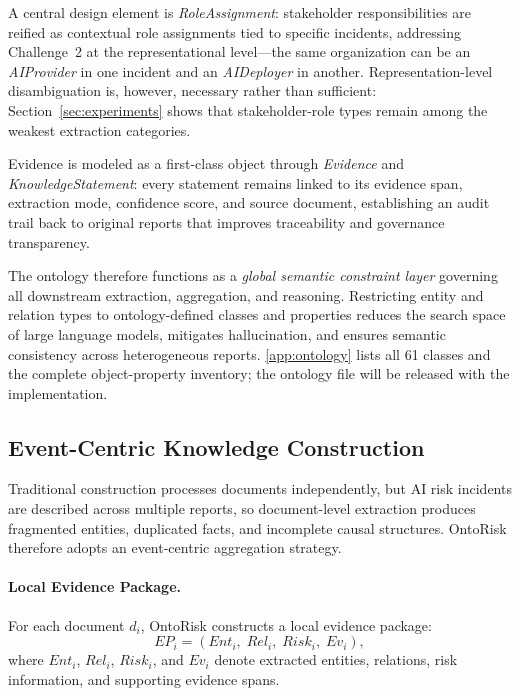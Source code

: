 \documentclass[a4paper,fleqn]{cas-dc}
\begin{document}
A central design element is \textit{RoleAssignment}: stakeholder
responsibilities are reified as contextual role assignments tied to
specific incidents, addressing Challenge~2 at the representational
level---the same organization can be an \textit{AIProvider} in one
incident and an \textit{AIDeployer} in another.
Representation-level disambiguation is, however, necessary rather
than sufficient: Section~\ref{sec:experiments} shows that
stakeholder-role types remain among the weakest extraction
categories.

Evidence is modeled as a first-class object through
\textit{Evidence} and \textit{KnowledgeStatement}: every statement
remains linked to its evidence span, extraction mode, confidence
score, and source document, establishing an audit trail back to
original reports that improves traceability and governance
transparency.

The ontology therefore functions as a \emph{global semantic
constraint layer} governing all downstream extraction, aggregation,
and reasoning.
Restricting entity and relation types to ontology-defined classes and
properties reduces the search space of large language models,
mitigates hallucination, and ensures semantic consistency across
heterogeneous reports.
\ref{app:ontology} lists all 61 classes and the complete
object-property inventory; the ontology file will be released
with the implementation.

\subsection{Event-Centric Knowledge Construction}

Traditional construction processes documents independently, but AI
risk incidents are described across multiple reports, so
document-level extraction produces fragmented entities, duplicated
facts, and incomplete causal structures.
OntoRisk therefore adopts an event-centric aggregation strategy.

\paragraph{Local Evidence Package.}
For each document $d_i$, OntoRisk constructs a local evidence package:
\begin{equation}
  EP_i = (\mathit{Ent}_i,\; \mathit{Rel}_i,\; \mathit{Risk}_i,\;
          \mathit{Ev}_i),
\end{equation}
where $\mathit{Ent}_i$, $\mathit{Rel}_i$, $\mathit{Risk}_i$, and
$\mathit{Ev}_i$ denote extracted entities, relations, risk
information, and supporting evidence spans.
\end{document}

